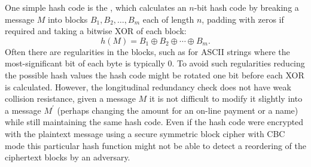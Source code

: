 One simple hash code is the , which calculates
an $n$-bit hash code by breaking a message $M$ into blocks $B_1, B_2, \dots, B_m$
each of length $n$, padding with zeros if required and taking a bitwise
XOR of each block:
\begin{displaymath}
  h(M) = B_1 \oplus B_2 \oplus \cdots \oplus B_m.
\end{displaymath}
Often there are regularities in the blocks, such as for ASCII strings where the
most-significant bit of each byte is typically $0$.
To avoid such regularities reducing the possible hash values the hash code might be
rotated one bit before each XOR is calculated.
However, the longitudinal redundancy check does not have weak collision resistance,
given a message $M$ it is not difficult to modify it slightly into a message $M^\prime$
(perhaps changing the amount for an on-line payment or a name) while still
maintaining the same hash code.
Even if the hash code were encrypted with the plaintext message using
a secure symmetric block cipher with CBC mode this particular hash function might not be able
to detect a reordering of the ciphertext blocks by an adversary.

